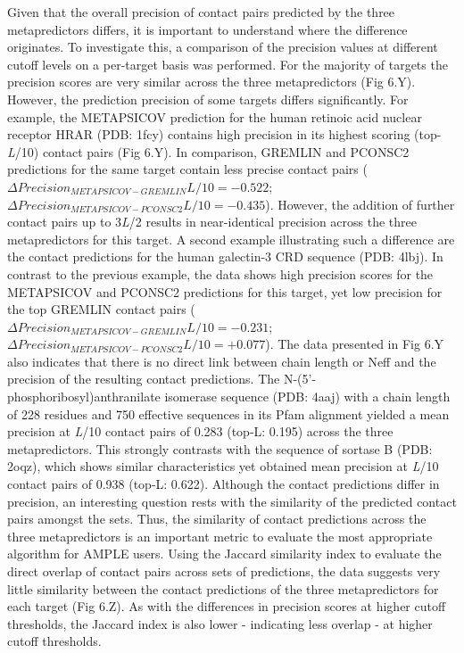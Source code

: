 Given that the overall precision of contact pairs predicted by the three metapredictors differs, it is important to understand where the difference originates. To investigate this, a comparison of the precision values at different cutoff levels on a per-target basis was performed. For the majority of targets the precision scores are very similar across the three metapredictors (Fig 6.Y). However, the prediction precision of some targets differs significantly. For example, the METAPSICOV prediction for the human retinoic acid nuclear receptor HRAR (PDB: 1fcy) contains high precision in its highest scoring (top-\textit{L}/10) contact pairs (Fig 6.Y). In comparison, GREMLIN and PCONSC2 predictions for the same target contain less precise contact pairs ($\Delta Precision_{METAPSICOV-GREMLIN} L/10=-0.522$; $\Delta Precision_{METAPSICOV-PCONSC2} L/10=-0.435$). However, the addition of further contact pairs up to 3\textit{L}/2 results in near-identical precision across the three metapredictors for this target. A second example illustrating such a difference are the contact predictions for the human galectin-3 CRD sequence (PDB: 4lbj). In contrast to the previous example, the data shows high precision scores for the METAPSICOV and PCONSC2 predictions for this target, yet low precision for the top GREMLIN contact pairs ($\Delta Precision_{METAPSICOV-GREMLIN} L/10=-0.231$; $\Delta Precision_{METAPSICOV-PCONSC2} L/10=+0.077$). 
The data presented in Fig 6.Y also indicates that there is no direct link between chain length or Neff and the precision of the resulting contact predictions. The N-(5'-phosphoribosyl)anthranilate isomerase sequence (PDB: 4aaj) with a chain length of 228 residues and 750 effective sequences in its Pfam alignment yielded a mean precision at \textit{L}/10 contact pairs of 0.283 (top-L: 0.195) across the three metapredictors. This strongly contrasts with the sequence of sortase B (PDB: 2oqz), which shows similar characteristics yet obtained  mean precision at \textit{L}/10 contact pairs of 0.938 (top-L: 0.622).
Although the contact predictions differ in precision, an interesting question rests with the similarity of the predicted contact pairs amongst the sets. Thus, the similarity of contact predictions across the three metapredictors is an important metric to evaluate the most appropriate algorithm for AMPLE users. Using the Jaccard similarity index to evaluate the direct overlap of contact pairs across sets of predictions, the data suggests very little similarity between the contact predictions of the three metapredictors for each target (Fig 6.Z). As with the differences in precision scores at higher cutoff thresholds, the Jaccard index is also lower - indicating less overlap - at higher cutoff thresholds.
